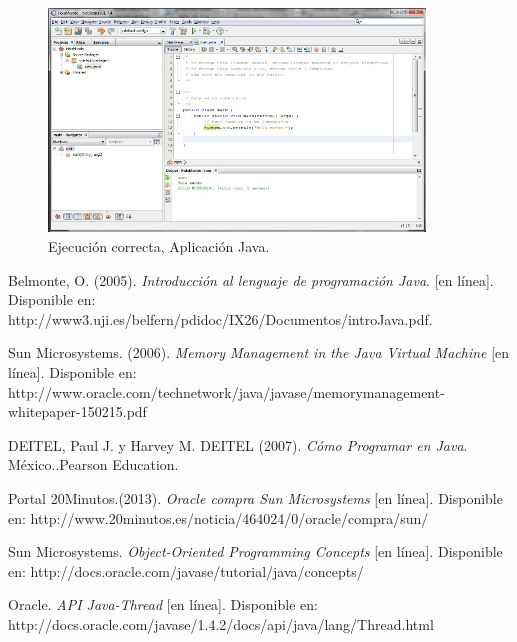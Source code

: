 \documentclass[12pt]{book} %
\begin{document}
	\begin{figure}[h]
		\centering
			\includegraphics[width=10cm]{Hola_mundo_004.jpg}
			\caption{Ejecuci\'on correcta, Aplicaci\'on Java.}
		
	\end{figure}
	
\begin{thebibliography}{99}
 Belmonte, O. (2005). \textsl{Introducci\'on al lenguaje de programaci\'on Java}. [en l\'inea]. Disponible en: http://www3.uji.es/belfern/pdidoc/IX26/Documentos/introJava.pdf.

 Sun Microsystems. (2006). \textsl{Memory Management in the Java Virtual Machine} [en l\'inea]. Disponible en: http://www.oracle.com/technetwork/java/javase/memorymanagement-whitepaper-150215.pdf

\bibitem DEITEL, Paul J. y Harvey M. DEITEL (2007). \textsl{C\'omo Programar en Java}. M\'exico..Pearson Education. 

\bibitem Portal 20Minutos.(2013). \textsl{Oracle compra Sun Microsystems} [en l\'inea]. Disponible en: http://www.20minutos.es/noticia/464024/0/oracle/compra/sun/

 Sun Microsystems. \textsl{Object-Oriented Programming Concepts} [en l\'inea]. Disponible en: http://docs.oracle.com/javase/tutorial/java/concepts/

 Oracle. \textsl{API Java-Thread} [en l\'inea]. Disponible en: http://docs.oracle.com/javase/1.4.2/docs/api/java/lang/Thread.html

\end{thebibliography}
\end{document}
